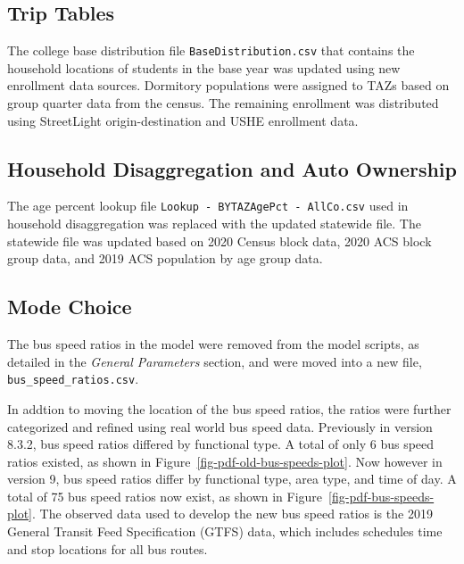 \documentclass[
  letterpaper,
  DIV=11,
  numbers=noendperiod]{scrreprt}
\begin{document}
\hypertarget{trip-tables}{%
\subsection{Trip Tables}\label{trip-tables}}

The college base distribution file \texttt{BaseDistribution.csv} that
contains the household locations of students in the base year was
updated using new enrollment data sources. Dormitory populations were
assigned to TAZs based on group quarter data from the census. The
remaining enrollment was distributed using StreetLight
origin-destination and USHE enrollment data.

\hypertarget{household-disaggregation-and-auto-ownership}{%
\subsection{Household Disaggregation and Auto
Ownership}\label{household-disaggregation-and-auto-ownership}}

The age percent lookup file
\texttt{Lookup\ -\ BYTAZAgePct\ -\ AllCo.csv} used in household
disaggregation was replaced with the updated statewide file. The
statewide file was updated based on 2020 Census block data, 2020 ACS
block group data, and 2019 ACS population by age group data.

\hypertarget{mode-choice}{%
\subsection{Mode Choice}\label{mode-choice}}

The bus speed ratios in the model were removed from the model scripts,
as detailed in the \emph{General Parameters} section, and were moved
into a new file, \texttt{bus\_speed\_ratios.csv}.

In addtion to moving the location of the bus speed ratios, the ratios
were further categorized and refined using real world bus speed data.
Previously in version 8.3.2, bus speed ratios differed by functional
type. A total of only 6 bus speed ratios existed, as shown in
Figure~\ref{fig-pdf-old-bus-speeds-plot}. Now however in version 9, bus
speed ratios differ by functional type, area type, and time of day. A
total of 75 bus speed ratios now exist, as shown in
Figure~\ref{fig-pdf-bus-speeds-plot}. The observed data used to develop
the new bus speed ratios is the 2019 General Transit Feed Specification
(GTFS) data, which includes schedules time and stop locations for all
bus routes.
\end{document}
